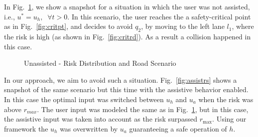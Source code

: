 \documentclass[letterpaper, 10 pt, conference]{ieeeconf}  %
\begin{document}


In Fig.~\ref{fig:noassist}, we show a snapshot for a situation in which the user was not assisted, i.e., $u^*=u_h, \;\;\forall t>0$. In this scenario, the user reaches the a safety-critical point as in Fig.~\ref{fig:critpt}, and decides to avoid $q_2$, by moving to the left lane $l_1$, where the risk is high (as shown in Fig.~\ref{fig:critrd}). As a result a collision happened in this case.

\begin{figure}[ht!]
	\centering
	\vspace{-5pt}
	\caption{Unassisted - Risk Distribution and Road Scenario}
	\label{fig:noassist}
	\vspace{-5pt}
\end{figure}

In our approach, we aim to avoid such a situation. Fig.~\ref{fig:assistrs} shows a snapshot of the same scenario but this time with the assistive behavior enabled. In this case the optimal input was switched between $u_h$ and $u_a$ when the risk was above $r_{max}$. 
The user input was modeled the same as in Fig.~\ref{fig:noassist}, but in this case, the assistive input was taken into account as the risk surpassed $r_{\max}$. Using our framework the $u_h$ was overwritten by $u_a$ guaranteeing a safe operation of $h$.
\end{document}
